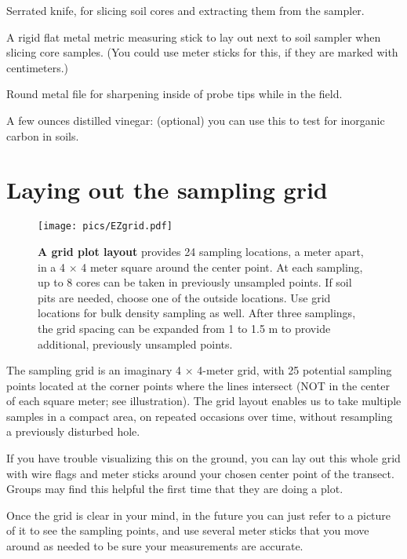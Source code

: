 \documentclass[11pt,letterpaper,twoside,onecolumn]{memoir}
\begin{document}
\begin{checkboxlist}
\item Serrated knife, for slicing soil cores and extracting them from the sampler.

\item A rigid flat metal metric measuring stick to lay out next to soil sampler when slicing core samples.  (You could use meter sticks for this, if they are marked with centimeters.)

\item Round metal file for sharpening inside of probe tips while in the field. 

\item A few ounces distilled vinegar: (optional) you can use this to test for inorganic carbon in soils.

\end{checkboxlist}

\section*{Laying out the sampling grid}

\begin{figure}
\centering
\texttt{[image: pics/EZgrid.pdf]}
\caption*{\textbf{A grid plot layout} provides 24 sampling locations, a meter apart, in a 4 $\times$ 4 meter square around the center point. \label{EZgrid}At each sampling, up to 8 cores can be taken in previously unsampled points. If soil pits are needed, choose one of the outside locations. Use grid locations for bulk density sampling as well. After three samplings, the grid spacing can be expanded from 1 to 1.5 m to provide additional, previously unsampled points.}
\end{figure}


The sampling grid is an imaginary 4 $\times$ 4-meter grid, with 25 potential sampling points located at the corner points where the lines intersect (NOT in the center of each square meter; see illustration). The grid layout enables us to take multiple samples in a compact area, on repeated occasions over time, without resampling a previously disturbed hole.

If you have trouble visualizing this on the ground, you can lay out this whole grid with wire flags and meter sticks around your chosen center point of the transect. Groups may find this helpful the first time that they are doing a plot.

Once the grid is clear in your mind, in the future you can just refer to a picture of it to see the sampling points, and use several meter sticks that you move around as needed to be sure your measurements are accurate.
\end{document}
